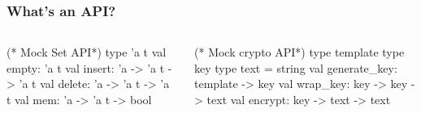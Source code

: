 \documentclass[10pt]{beamer}
\begin{document}




\begin{frame}[fragile]
\frametitle{What's an API?}
  \begin{columns}
\begin{ocaml}
(* Mock Set API*)
type 'a t
val empty: 'a t
val insert: 'a -> 'a t -> 'a t
val delete: 'a -> 'a t -> 'a t
val mem: 'a -> 'a t -> bool
$ $
\end{ocaml}
\begin{ocaml}
(* Mock crypto API*)
type template
type key
type text = string
val generate_key: template -> key
val wrap_key: key -> key -> text
val encrypt: key -> text -> text
\end{ocaml}
\end{columns}


\end{frame}
\end{document}

